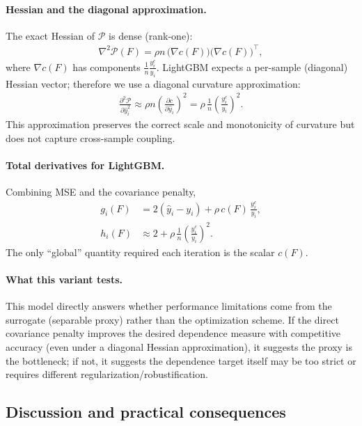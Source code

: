 \documentclass[11pt]{article}
\theoremstyle{plain}
\theoremstyle{definition}
\newcommand{\1}{\mathbf{1}}
\begin{document}
\paragraph{Hessian and the diagonal approximation.}
The exact Hessian of $\mathcal{P}$ is dense (rank-one):
\begin{align}
\nabla^2 \mathcal{P}(F) = \rho n\, \Big(\nabla c(F)\Big)\Big(\nabla c(F)\Big)^\top,
\end{align}
where $\nabla c(F)$ has components $\frac{1}{n}\frac{y_i^c}{y_i}$. LightGBM expects a per-sample (diagonal) Hessian vector; therefore we use a diagonal curvature approximation:
\begin{align}
\frac{\partial^2 \mathcal{P}}{\partial \hat y_i^2}
\approx \rho n\left(\frac{\partial c}{\partial \hat y_i}\right)^2
= \rho\,\frac{1}{n}\left(\frac{y_i^c}{y_i}\right)^2.
\label{eq:hess_diag_cov_penalty}
\end{align}
This approximation preserves the correct scale and monotonicity of curvature but does not capture cross-sample coupling.

\paragraph{Total derivatives for LightGBM.}
Combining MSE and the covariance penalty,
\begin{align}
 g_i(F) &= 2(\hat y_i-y_i) + \rho\,c(F)\,\frac{y_i^c}{y_i},
\\
 h_i(F) &\approx 2 + \rho\,\frac{1}{n}\left(\frac{y_i^c}{y_i}\right)^2.
\label{eq:direct_cov_gh}
\end{align}
The only ``global'' quantity required each iteration is the scalar $c(F)$.

\paragraph{What this variant tests.}
This model directly answers whether performance limitations come from the surrogate (separable proxy) rather than the optimization scheme. If the direct covariance penalty improves the desired dependence measure with competitive accuracy (even under a diagonal Hessian approximation), it suggests the proxy is the bottleneck; if not, it suggests the dependence target itself may be too strict or requires different regularization/robustification.

\subsection{Discussion and practical consequences}
\label{subsec:discussion_variants}
\end{document}
